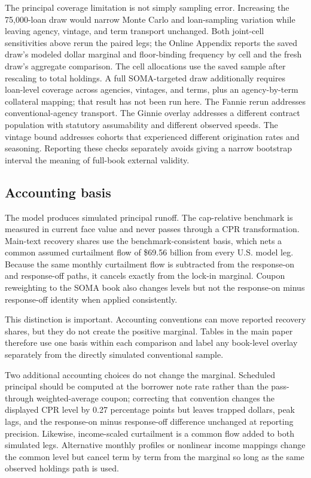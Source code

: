 The principal coverage limitation is not simply sampling error. Increasing the 75,000-loan draw would narrow Monte Carlo and loan-sampling variation while leaving agency, vintage, and term transport unchanged. Both joint-cell sensitivities above rerun the paired legs; the Online Appendix reports the saved draw's modeled dollar marginal and floor-binding frequency by cell and the fresh draw's aggregate comparison. The cell allocations use the saved sample after rescaling to total holdings. A full SOMA-targeted draw additionally requires loan-level coverage across agencies, vintages, and terms, plus an agency-by-term collateral mapping; that result has not been run here. The Fannie rerun addresses conventional-agency transport. The Ginnie overlay addresses a different contract population with statutory assumability and different observed speeds. The vintage bound addresses cohorts that experienced different origination rates and seasoning. Reporting these checks separately avoids giving a narrow bootstrap interval the meaning of full-book external validity.

\subsection{Accounting basis}

The model produces simulated principal runoff. The cap-relative benchmark is measured in current face value and never passes through a CPR transformation. Main-text recovery shares use the benchmark-consistent basis, which nets a common assumed curtailment flow of \$69.56 billion from every U.S. model leg. Because the same monthly curtailment flow is subtracted from the response-on and response-off paths, it cancels exactly from the lock-in marginal. Coupon reweighting to the SOMA book also changes levels but not the response-on minus response-off identity when applied consistently.

This distinction is important. Accounting conventions can move reported recovery shares, but they do not create the positive marginal. Tables in the main paper therefore use one basis within each comparison and label any book-level overlay separately from the directly simulated conventional sample.

Two additional accounting choices do not change the marginal. Scheduled principal should be computed at the borrower note rate rather than the pass-through weighted-average coupon; correcting that convention changes the displayed CPR level by 0.27 percentage points but leaves trapped dollars, peak lags, and the response-on minus response-off difference unchanged at reporting precision. Likewise, income-scaled curtailment is a common flow added to both simulated legs. Alternative monthly profiles or nonlinear income mappings change the common level but cancel term by term from the marginal so long as the same observed holdings path is used.

